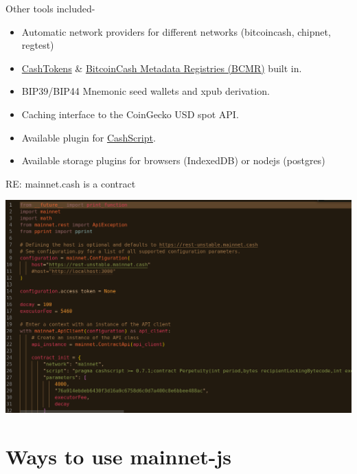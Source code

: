 \documentclass{beamer}
\begin{document}
\begin{frame}{Other tools included}{-}
  \begin{itemize}
    \item
      Automatic network providers for different networks (bitcoincash, chipnet, regtest)
    \item
      \href{https://github.com/bitjson/cashtokens}{CashTokens} \& \href{https://github.com/bitjson/chip-bcmr}{BitcoinCash Metadata Registries (BCMR)} built in.
    \item
      BIP39/BIP44 Mnemonic seed wallets and xpub derivation.   
    \item
      Caching interface to the CoinGecko USD spot API.
    \item
      Available plugin for \href{https://cashscript.org/}{CashScript}.
    \item
      Available storage plugins for browsers (IndexedDB) or nodejs (postgres)
    \end{itemize}
\end{frame}


\begin{frame}{RE: mainnet.cash is a contract}{}

  \includegraphics[width=1\textwidth, angle=0]{python_perp.png}
\end{frame}



\section{Ways to use mainnet-js}
\end{document}
